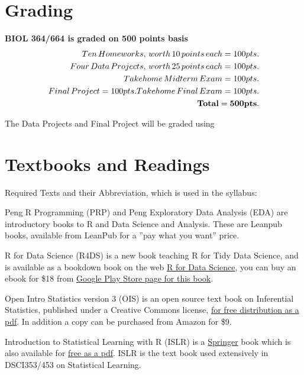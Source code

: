 \documentclass[11pt]{article} %
\begin{document}
\section{Grading}

  {\bf BIOL 364/664 is graded on 500 points basis}
  \begin{align*}
    Ten \, Homeworks, \, worth \, 10 \, points \, each = 100 pts.\\
    Four \, Data \, Projects, \, worth \, 25 \, points \, each = 100 pts.\\
    Takehome \, Midterm \, Exam = 100 pts.\\
    Final \, Project = 100 pts.
    Takehome \, Final \, Exam = 100 pts. \\
    {\bf Total = 500 pts.}
  \end{align*}

  The Data Projects and Final Project will be graded using 

\section{Textbooks and Readings}

  Required Texts and their Abbreviation, which is used in the syllabus:
  
  Peng R Programming (PRP) and Peng Exploratory Data Analysis (EDA) are introductory books to R and Data Science and Analysis. 
  These are  Leanpub books, available from LeanPub for a ”pay what you want” price. 
  
  R for Data Science (R4DS) is a new book teaching R for Tidy Data Science, and is available as a bookdown book on the web \href{http://r4ds.had.co.nz/}{R for Data Science}, you can buy an ebook for \$18 from \href{https://play.google.com/store/books/details/Hadley_Wickham_R_for_Data_Science?id=I6y3DQAAQBAJ}{Google Play Store page for this book}. 
  
  Open Intro Statistics version 3 (OIS) is an open source text book on Inferential Statistics, published under a Creative Commons license, \href{https://drive.google.com/file/d/0B-DHaDEbiOGkc1RycUtIcUtIelE/view}{for free distribution as a pdf}. 
  In addition a copy can be purchased from Amazon for \$9. 
  
  Introduction to Statistical Learning with R (ISLR) is a \href{"http://www.springer.com/us/book/9781461471370"}{Springer} book which is also available for  \href{http://www-bcf.usc.edu/~gareth/ISL/ISLR\%20Seventh\%20Printing.pdf}{free as a pdf}. ISLR is the text book used extensively in DSCI353/453 on Statistical Learning. 
  
\end{document}
